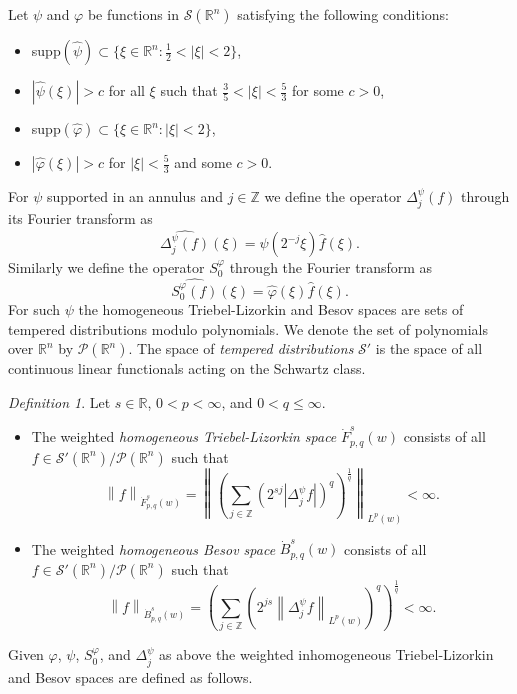 \documentclass[10pt,a4paper]{article}
\theoremstyle{remark}
\newtheorem{dfn}{Definition}[section]
\newcommand{\ent}{\mathbb{Z}}
\newcommand{\rn}{{{\mathbb R}^n}}
\newcommand{\sw}{{\mathcal{S}}(\rn)}
\newcommand{\swp}{{\mathcal{S}'}(\rn)}
\newcommand{\tlw}[4]{\dot F_{#1,#3}^{#2}(#4)} %
\newcommand{\besw}[4]{\dot B_{#1,#3}^{#2}(#4)} %
\newcommand{\lebw}[2]{L^{#1}(#2)} %
\newcommand{\norm}[2]{\left\|#1\right\|_{#2}}
\begin{document}
Let $\psi$ and $\varphi$ be functions in $\sw$ satisfying the following conditions:
\begin{itemize}
\item supp$(\widehat{\psi})\subset\{\xi\in\rn : \frac{1}{2} < |\xi| <2\}$,
\item $|\widehat{\psi}(\xi)|>c$ for all $\xi$ such that $\frac{3}{5} < |\xi| < \frac{5}{3}$ for some $c>0$,
\item supp$(\widehat{\varphi}) \subset \{\xi\in\rn : |\xi| < 2\}$,
\item $|\widehat{\varphi}(\xi)|>c$ for $|\xi| < \frac{5}{3}$ and some $c>0$. 
\end{itemize}
For $\psi$ supported in an annulus and $j\in\ent$ we define the operator $\Delta^\psi_j(f)$ through its Fourier transform as \[\widehat{\Delta^\psi_j (f)}(\xi) = \psi(2^{-j}\xi)\widehat{f}(\xi).\]
Similarly we define the operator $S^\varphi_0$ through the Fourier transform as
\[ \widehat{S^\varphi_0 (f)}(\xi) = \widehat{\varphi}(\xi)\widehat{f}(\xi).\]
For such $\psi$ the homogeneous Triebel-Lizorkin and Besov spaces are sets of tempered distributions modulo polynomials. We denote the set of polynomials over $\rn$ by $\mathcal{P}(\rn)$. The space of \textit{tempered distributions} $\mathcal{S}'$ is the space of all continuous linear functionals acting on the Schwartz class.

\begin{dfn}\label{TL_B_def}
Let $s\in\mathbb{R}$, $0<p<\infty$, and $0<q\leq\infty$.
\begin{itemize}
\item The weighted \textit{homogeneous Triebel-Lizorkin space} $\tlw{p}{s}{q}{w}$ consists of all $f\in \swp/\mathcal{P}(\rn)$ such that 
\begin{equation*}
\norm{f}{\tlw{p}{s}{q}{w}}=\norm{\left(\sum_{j\in\ent}(2^{sj}|\Delta^\psi_jf|)^q\right)^{\frac{1}{q}}}{\lebw{p}{w}}<\infty.
\end{equation*}
\item The weighted \textit{homogeneous Besov space} $\besw{p}{s}{q}{w}$ consists of all $f\in \swp/\mathcal{P}(\rn)$ such that 
\begin{equation}
\norm{f}{\besw{p}{s}{q}{w}} = \left(\sum_{j\in\ent} (2^{js}\norm{\Delta^\psi_jf}{L^p(w)})^q\right)^{\frac{1}{q}} < \infty.
\end{equation}
\end{itemize}
\end{dfn}

Given $\varphi$, $\psi$, $S^\varphi_0$, and $\Delta^\psi_j$ as above the weighted inhomogeneous Triebel-Lizorkin and Besov spaces are defined as follows. 
\end{document}
